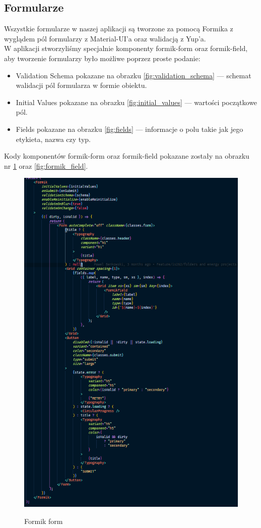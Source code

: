 \documentclass[a4paper,11pt]{report}
\begin{document}
\subsection{Formularze}
\label{subsec:forms}
Wszystkie formularze w naszej aplikacji są tworzone za pomocą Formika z wyglądem pól formularzy z Material-UI'a oraz walidacją z Yup'a.\\
W aplikacji stworzyliśmy specjalnie komponenty formik-form oraz formik-field, aby tworzenie formularzy było możliwe poprzez proste podanie:
\begin{itemize}
	\item Validation Schema pokazane na obrazku \ref{fig:validation_schema} — schemat walidacji pól formularza w formie obiektu.
	\item Initial Values pokazane na obrazku \ref{fig:initial_values} — wartości początkowe pól.
	\item Fields pokazane na obrazku \ref{fig:fields} — informacje o polu takie jak jego etykieta, nazwa czy typ.
\end{itemize}
Kody komponentów formik-form oraz formik-field pokazane zostały na obrazku nr \ref{fig:formik_form} oraz \ref{fig:formik_field}.
\begin{figure}[H]
	\centering
	\includegraphics[scale=0.8]{implementacja/frontend/formik_form}\\
	\caption{Formik form}
	\label{fig:formik_form}
\end{figure}
\end{document}
